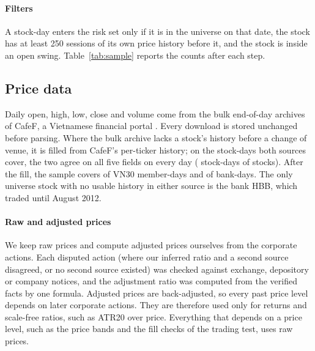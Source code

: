 \paragraph{Filters} A stock-day enters the risk set only if it is in the universe on that date, the
stock has at least 250 sessions of its own price history before it, and the stock is inside an open
swing. Table~\ref{tab:sample} reports the counts after each step.

\begin{table}[!htbp]
\centering
\caption{Sample construction, 3 January 2012 to 20 November 2026. Survival rows are stock-sessions
inside an open swing ($k=2$). Development rows (2012--2016) lie inside the first training window;
test rows (2017--2026) are scored only by the final walk-forward run. The Banks and VN30 columns
overlap: banks in the VN30 count in both. Three universe stocks have no survival rows: the bank
HBB (no prices) and two stocks that entered the universe in August 2026, the bank PCB and the VN30
member MCH.}\label{tab:sample}
\small
{}
\end{table}

\subsection{Price data}\label{sec:prices}

Daily open, high, low, close and volume come from the bulk end-of-day archives of CafeF, a
Vietnamese financial portal \citep{CafeF2026}. Every download is stored
unchanged before parsing. Where the bulk archive lacks a stock's history before a change of venue,
it is filled from CafeF's per-ticker history; on the stock-days both sources cover, the two agree on
all five fields on every day (\PriceOverlapDays{} stock-days of \PriceOverlapTickers{} stocks). After the fill, the sample covers
 of VN30 member-days and  of bank-days. The only universe stock with no usable history in either source is the bank
HBB, which traded until August 2012.

\paragraph{Raw and adjusted prices} We keep raw prices and compute adjusted prices ourselves from
the corporate actions. Each disputed action (where our inferred ratio and a second source disagreed,
or no second source existed) was checked against exchange, depository or company notices, and the
adjustment ratio was computed from the verified facts by one formula. Adjusted prices are
back-adjusted, so every past price level depends on later corporate actions. They are therefore used
only for returns and scale-free ratios, such as ATR20 over price. Everything that depends on a price
level, such as the price bands and the fill checks of the trading test, uses raw prices.

